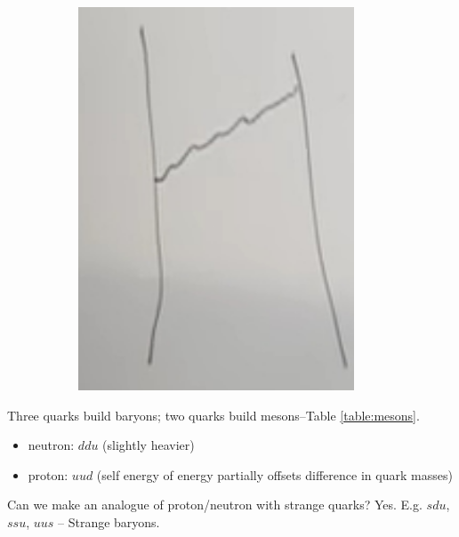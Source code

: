 \documentclass[]{article}
\begin{document}
\begin{figure}[H]
\begin{subfigure}[t]{0.45\textwidth}
		\includegraphics[width=0.9\textwidth]{2-1-em-process-feynman}
	\end{subfigure}
\end{figure}

Three quarks build baryons; two quarks build mesons--Table \ref{table:mesons}.
\begin{itemize}
	\item neutron: $ddu$ (slightly heavier)
	\item proton: $uud$ (self energy of energy partially offsets difference in quark masses)
\end{itemize}

Can we make an analogue of proton/neutron with strange quarks? Yes. E.g. $sdu$, $ssu$, $uus$ -- Strange baryons.
\end{document}
